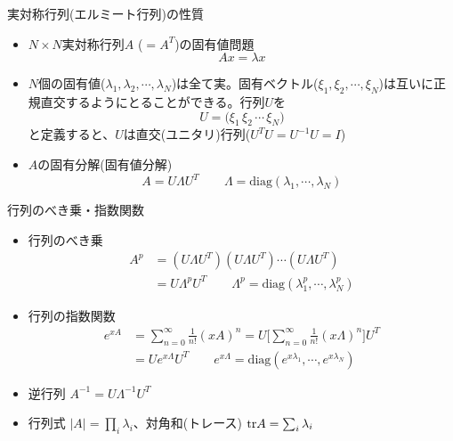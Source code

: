 \begin{frame}[t,fragile]{実対称行列(エルミート行列)の性質}
  \begin{itemize}
  \item $N \times N$実対称行列$A$ ($=A^T$)の固有値問題
    \[
    A x = \lambda x
    \]
  \item $N$個の固有値($\lambda_1,\lambda_2,\cdots,\lambda_N$)は全て実。固有ベクトル($\xi_1,\xi_2,\cdots,\xi_N$)は互いに正規直交するようにとることができる。行列$U$を
    \[
    U = \Big( \xi_1 \, \xi_2 \, \cdots \, \xi_N \Big)
    \]
    と定義すると、$U$は直交(ユニタリ)行列($U^T U = U^{-1} U = I$)
  \item $A$の固有分解(固有値分解)
    \[
    A = U \Lambda U^T \qquad \Lambda = \text{diag}(\lambda_1,\cdots,\lambda_N)
    \]
  \end{itemize}
\end{frame}

\begin{frame}[t,fragile]{行列のべき乗・指数関数}
  \begin{itemize}
  \item 行列のべき乗
    \begin{align*}
      A^p &= (U \Lambda U^T)(U \Lambda U^T) \cdots (U \Lambda U^T) \\
      &= U \Lambda^p U^T \qquad \Lambda^p = \text{diag}(\lambda_1^p,\cdots,\lambda_N^p)
    \end{align*}
  \item 行列の指数関数
    \begin{align*}
      e^{xA} &= \sum_{n=0}^{\infty} \frac{1}{n!}(xA)^n = U \Big[ \sum_{n=0}^{\infty} \frac{1}{n!}(x\Lambda)^n \Big] U^T \\
      &= U e^{x \Lambda} U^T \qquad e^{x \Lambda} = \text{diag}(e^{x\lambda_1},\cdots,e^{x\lambda_N})
    \end{align*}
  \item 逆行列 $A^{-1} = U \Lambda^{-1} U^T$
  \item 行列式 $|A| = \prod_i \lambda_i$、対角和(トレース) ${\rm tr} A = \sum_i \lambda_i$
  \end{itemize}
\end{frame}

